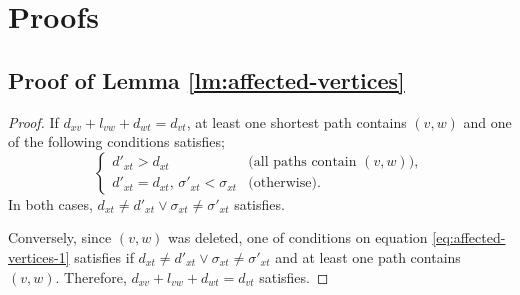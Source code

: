 
\section{Proofs}

\subsection{Proof of Lemma \ref{lm:affected-vertices}}
\begin{proof}
  If $d_{xv}+l_{vw}+d_{wt}=d_{vt}$, at least one shortest path contains $(v,w)$ and one of the following conditions satisfies;
  \begin{equation}
    \begin{cases}
      d'_{xt}>d_{xt} & \text{(all paths contain $(v,w)$)},\\
      d'_{xt}=d_{xt},\,\sigma'_{xt}<\sigma_{xt} & \text{(otherwise)}.
    \end{cases}
    \label{eq:affected-vertices-1}
  \end{equation}
  In both cases, $d_{xt}\neq d'_{xt}\lor\sigma_{xt}\neq\sigma'_{xt}$ satisfies.
  
  Conversely, since $(v,w)$ was deleted, one of conditions on equation \eqref{eq:affected-vertices-1} satisfies if $d_{xt}\neq d'_{xt}\lor\sigma_{xt}\neq\sigma'_{xt}$ and at least one path contains $(v,w)$.
  Therefore, $d_{xv}+l_{vw}+d_{wt}=d_{vt}$ satisfies.
\end{proof}


